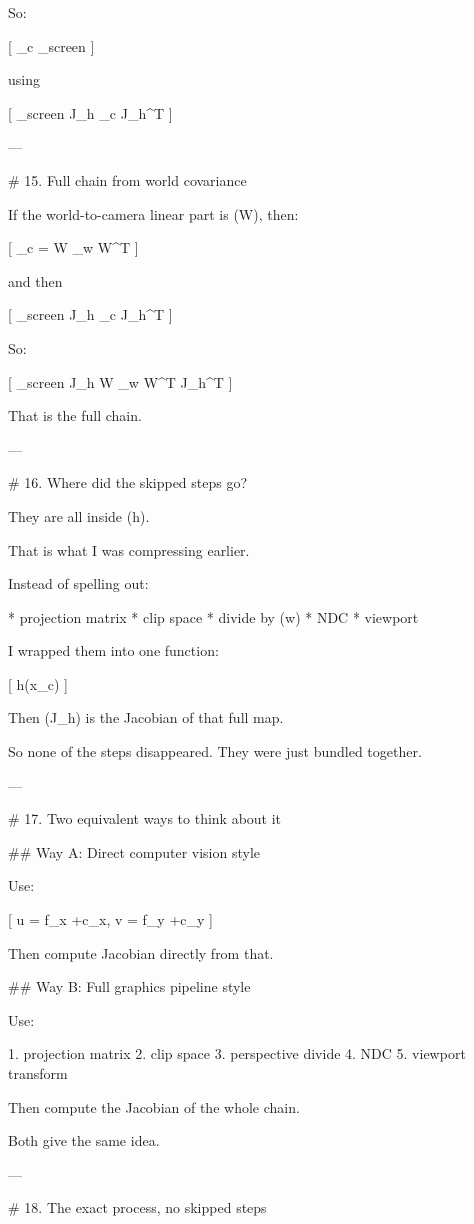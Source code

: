 So:

[
\Sigma_c \to \Sigma_{screen}
]

using

[
\Sigma_{screen} \approx J_h \Sigma_c J_h^T
]

---

# 15. Full chain from world covariance

If the world-to-camera linear part is (W), then:

[
\Sigma_c = W \Sigma_w W^T
]

and then

[
\Sigma_{screen} \approx J_h \Sigma_c J_h^T
]

So:

[
\Sigma_{screen} \approx J_h W \Sigma_w W^T J_h^T
]

That is the full chain.

---

# 16. Where did the skipped steps go?

They are all inside (h).

That is what I was compressing earlier.

Instead of spelling out:

* projection matrix
* clip space
* divide by (w)
* NDC
* viewport

I wrapped them into one function:

[
h(x_c)
]

Then (J_h) is the Jacobian of that full map.

So none of the steps disappeared.
They were just bundled together.

---

# 17. Two equivalent ways to think about it

## Way A: Direct computer vision style

Use:

[
u = f_x +c_x,\qquad
v = f_y +c_y
]

Then compute Jacobian directly from that.

## Way B: Full graphics pipeline style

Use:

1. projection matrix
2. clip space
3. perspective divide
4. NDC
5. viewport transform

Then compute the Jacobian of the whole chain.

Both give the same idea.

---

# 18. The exact process, no skipped steps

